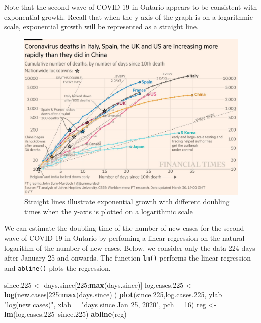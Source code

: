 \documentclass[]{book}
\newenvironment{Shaded}{\begin{snugshade}}{\end{snugshade}}
\newcommand{\KeywordTok}[1]{\textcolor[rgb]{0.13,0.29,0.53}{\textbf{{#1}}}}
\newcommand{\DataTypeTok}[1]{\textcolor[rgb]{0.13,0.29,0.53}{{#1}}}
\newcommand{\DecValTok}[1]{\textcolor[rgb]{0.00,0.00,0.81}{{#1}}}
\newcommand{\FloatTok}[1]{\textcolor[rgb]{0.00,0.00,0.81}{{#1}}}
\newcommand{\StringTok}[1]{\textcolor[rgb]{0.31,0.60,0.02}{{#1}}}
\newcommand{\NormalTok}[1]{{#1}}
\begin{document}
Note that the second wave of COVID-19 in Ontario appears to be
consistent with exponential growth. Recall that when the y-axis of the
graph is on a logarithmic scale, exponential growth will be represented
as a straight line.

\begin{figure}
\includegraphics[width=0.95\linewidth]{figures/doublingtime} \caption{Straight lines illustrate exponential growth with different doubling times when the y-axis is plotted on a logarithmic scale}\label{fig:doublingtime2}
\end{figure}

We can estimate the doubling time of the number of new cases for the
second wave of COVID-19 in Ontario by perfoming a linear regression on
the natural logarithm of the number of new cases. Below, we consider
only the data 224 days after January 25 and onwards. The function
\texttt{lm()} performs the linear regression and \texttt{abline()} plots
the regression.

\begin{Shaded}
\begin{Highlighting}[]
\NormalTok{since}\FloatTok{.225} \NormalTok{<-}\StringTok{ }\NormalTok{days.since[}\DecValTok{225}\NormalTok{:}\KeywordTok{max}\NormalTok{(days.since)]}
\NormalTok{log.cases}\FloatTok{.225} \NormalTok{<-}\StringTok{ }\KeywordTok{log}\NormalTok{(new.cases[}\DecValTok{225}\NormalTok{:}\KeywordTok{max}\NormalTok{(days.since)])}
\KeywordTok{plot}\NormalTok{(since}\FloatTok{.225}\NormalTok{,log.cases}\FloatTok{.225}\NormalTok{, }\DataTypeTok{ylab =} \StringTok{"log(new cases)"}\NormalTok{, }\DataTypeTok{xlab =} \StringTok{"days since Jan 25, 2020"}\NormalTok{, }\DataTypeTok{pch =} \DecValTok{16}\NormalTok{)}
\NormalTok{reg <-}\StringTok{ }\KeywordTok{lm}\NormalTok{(log.cases}\FloatTok{.225}\NormalTok{~since}\FloatTok{.225}\NormalTok{)}
\KeywordTok{abline}\NormalTok{(reg)}
\end{Highlighting}
\end{Shaded}
\end{document}
